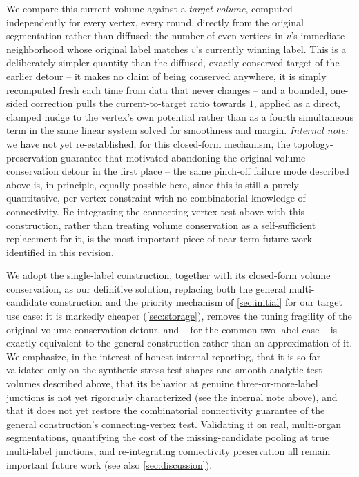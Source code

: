 \documentclass[journal]{vgtc}                     %
\begin{document}
We compare this current volume against a \emph{target volume}, computed independently for every vertex, every round, directly from the original segmentation rather than diffused: the number of even vertices in $v$'s immediate neighborhood whose original label matches $v$'s currently winning label. This is a deliberately simpler quantity than the diffused, exactly-conserved target of the earlier detour -- it makes no claim of being conserved anywhere, it is simply recomputed fresh each time from data that never changes -- and a bounded, one-sided correction pulls the current-to-target ratio towards $1$, applied as a direct, clamped nudge to the vertex's own potential rather than as a fourth simultaneous term in the same linear system solved for smoothness and margin. \emph{Internal note:} we have not yet re-established, for this closed-form mechanism, the topology-preservation guarantee that motivated abandoning the original volume-conservation detour in the first place -- the same pinch-off failure mode described above is, in principle, equally possible here, since this is still a purely quantitative, per-vertex constraint with no combinatorial knowledge of connectivity. Re-integrating the connecting-vertex test above with this construction, rather than treating volume conservation as a self-sufficient replacement for it, is the most important piece of near-term future work identified in this revision.

We adopt the single-label construction, together with its closed-form volume conservation, as our definitive solution, replacing both the general multi-candidate construction and the priority mechanism of \cref{sec:initial} for our target use case: it is markedly cheaper (\cref{sec:storage}), removes the tuning fragility of the original volume-conservation detour, and -- for the common two-label case -- is exactly equivalent to the general construction rather than an approximation of it. We emphasize, in the interest of honest internal reporting, that it is so far validated only on the synthetic stress-test shapes and smooth analytic test volumes described above, that its behavior at genuine three-or-more-label junctions is not yet rigorously characterized (see the internal note above), and that it does not yet restore the combinatorial connectivity guarantee of the general construction's connecting-vertex test. Validating it on real, multi-organ segmentations, quantifying the cost of the missing-candidate pooling at true multi-label junctions, and re-integrating connectivity preservation all remain important future work (see also \cref{sec:discussion}).
\end{document}

